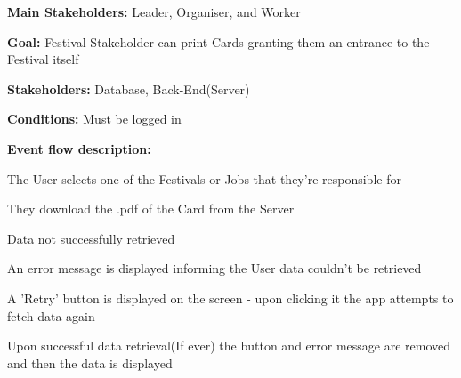 			\noindent {}
			\begin{packed_item}
				\item \textbf{Main Stakeholders:} Leader, Organiser, and Worker
				\item \textbf{Goal:} Festival Stakeholder can print Cards granting them an entrance to the Festival itself
				\item \textbf{Stakeholders: } Database, Back-End(Server)
				\item \textbf{Conditions: } Must be logged in
				\item \textbf{Event flow description: }
				\begin{packed_enum}
					\item The User selects one of the Festivals or Jobs that they're responsible for
					\item They download the .pdf of the Card from the Server
				\end{packed_enum}
				
				\begin{packed_item}
					\item[2.a] Data not successfully retrieved
					\item[] \begin{packed_enum}
						\item An error message is displayed informing the User data couldn't be retrieved
						\item A 'Retry' button is displayed on the screen - upon clicking it the app attempts to fetch data again
						\item Upon successful data retrieval(If ever) the button and error message are removed and then the data is displayed
					\end{packed_enum}
				\end{packed_item}
			\end{packed_item}
		

